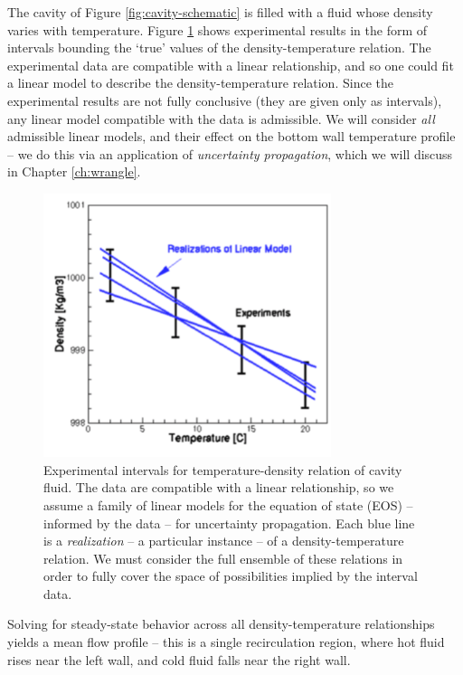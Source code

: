 \documentclass[../primer.tex]{subfiles}
\begin{document}
The cavity of Figure \ref{fig:cavity-schematic} is filled with a fluid whose
density varies with temperature. Figure \ref{fig:density-linear} shows
experimental results in the form of intervals bounding the `true' values of the
density-temperature relation. The experimental data are compatible with a linear
relationship, and so one could fit a linear model to describe the
density-temperature relation. Since the experimental results are not fully
conclusive (they are given only as intervals), any linear model compatible with
the data is admissible. We will consider \emph{all} admissible linear models,
and their effect on the bottom wall temperature profile -- we do this via an
application of \emph{uncertainty propagation}, which we will discuss in Chapter
\ref{ch:wrangle}.

\begin{figure}[!ht]
  \includegraphics[width=0.75\textwidth]{./images/density_linear}
  \caption{Experimental intervals for temperature-density relation of cavity
    fluid. The data are compatible with a linear relationship, so we assume a
    family of linear models for the equation of state (EOS) -- informed by the
    data -- for uncertainty propagation. Each blue line is a \emph{realization}
    -- a particular instance -- of a density-temperature relation. We must
    consider the full ensemble of these relations in order to fully cover the
    space of possibilities implied by the interval data.}
  \label{fig:density-linear}
\end{figure}

Solving for steady-state behavior across all density-temperature relationships
yields a mean flow profile -- this is a single recirculation region, where hot
fluid rises near the left wall, and cold fluid falls near the right wall.
\end{document}
